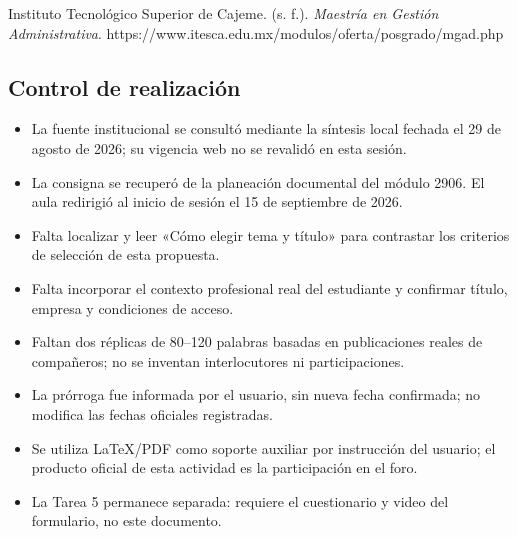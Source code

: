 \documentclass[
  spanish,
  11pt,
]{article}
\providecommand{\tightlist}{%
  \setlength{\itemsep}{0pt}\setlength{\parskip}{0pt}}
\begin{document}
Instituto Tecnológico Superior de Cajeme. (s. f.). \emph{Maestría en
Gestión Administrativa}.
https://www.itesca.edu.mx/modulos/oferta/posgrado/mgad.php

\subsection{Control de realización}\label{control-de-realizaciuxf3n}

\begin{itemize}
\tightlist
\item
  La fuente institucional se consultó mediante la síntesis local fechada
  el 29 de agosto de 2026; su vigencia web no se revalidó en esta
  sesión.
\item
  La consigna se recuperó de la planeación documental del módulo 2906.
  El aula redirigió al inicio de sesión el 15 de septiembre de 2026.
\item
  Falta localizar y leer «Cómo elegir tema y título» para contrastar los
  criterios de selección de esta propuesta.
\item
  Falta incorporar el contexto profesional real del estudiante y
  confirmar título, empresa y condiciones de acceso.
\item
  Faltan dos réplicas de 80--120 palabras basadas en publicaciones
  reales de compañeros; no se inventan interlocutores ni
  participaciones.
\item
  La prórroga fue informada por el usuario, sin nueva fecha confirmada;
  no modifica las fechas oficiales registradas.
\item
  Se utiliza LaTeX/PDF como soporte auxiliar por instrucción del
  usuario; el producto oficial de esta actividad es la participación en
  el foro.
\item
  La Tarea 5 permanece separada: requiere el cuestionario y video del
  formulario, no este documento.
\end{itemize}
\end{document}

